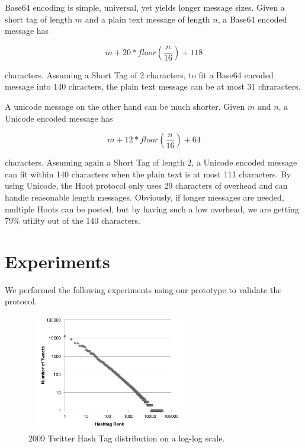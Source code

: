 \documentclass{acm_proc_article-sp}
\begin{document}
Base64 encoding is simple, universal, yet yields longer message sizes. Given a short tag of length $m$ and a plain text message of length $n$, a Base64 encoded message has

\begin{equation}
	m + 20 * floor(\frac{n}{16}) + 118
\end{equation}

characters. Assuming a Short Tag of 2 characters, to fit a Base64 encoded message into 140 chracters, the plain text message can be at most 31 chraracters.

A unicode message on the other hand can be much shorter. Given $m$ and $n$, a Unicode encoded message has

\begin{equation}
	m + 12 * floor(\frac{n}{16}) + 64
\end{equation}

characters. Assuming again a Short Tag of length 2, a Unicode encoded message can fit within 140 characters when the plain text is at most 111 characters. By using Unicode, the Hoot protocol only uses 29 characters of overhead and can handle reasonable length messages. Obviously, if longer messages are needed, multiple Hoots can be posted, but by having such a low overhead, we are getting 79\% utility out of the 140 characters.

\section{Experiments}

We performed the following experiments using our prototype to validate the protocol.

\begin{figure}[hash-dist]
\begin{center}
\includegraphics[height=2in,width=2.84in]{graphs/hash-tag-dist.pdf}
\caption{2009 Twitter Hash Tag distribution on a log-log scale.}
\end{center}
\end{figure}
\end{document}

